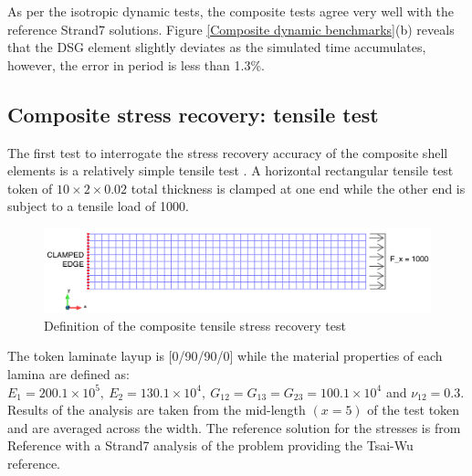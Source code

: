 As per the isotropic dynamic tests, the composite tests agree very well with the reference Strand7 solutions. Figure \ref{Composite dynamic benchmarks}(b) reveals that the DSG element slightly deviates as the simulated time accumulates, however, the error in period is less than 1.3\%.

\subsection{Composite stress recovery: tensile test}
The first test to interrogate the stress recovery accuracy of the composite shell elements is a relatively simple tensile test \cite{nasanettles1994}. A horizontal rectangular tensile test token of $10\times2\times0.02$ total thickness is clamped at one end while the other end is subject to a tensile load of 1000.

\begin{figure}[H]
	\centering
	\def\svgwidth{\columnwidth}
	\includegraphics[width=12cm]{images/composite_tensile_setup.png}
	\caption{Definition of the composite tensile stress recovery test}
\end{figure}

 The token laminate layup is [0/90/90/0] while the material properties of each lamina are defined as: $E_1 = 200.1\times10^5,\ E_2 = 130.1\times10^4,\ G_{12} = G_{13} = G_{23} = 100.1\times10^4$ and $\nu_{12} = 0.3$. Results of the analysis are taken from the mid-length $(x=5)$ of the test token and are averaged across the width. The reference solution for the stresses is from Reference \cite{nasanettles1994} with a Strand7 analysis of the problem providing the Tsai-Wu reference. 

